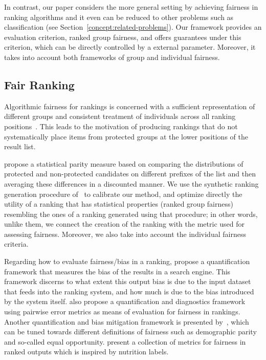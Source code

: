 In contrast, our paper considers the more general setting by achieving fairness in ranking algorithms and it even can be reduced to other problems such as classification (see Section~\ref{concept:related-problems}). Our framework provides an evaluation criterion, ranked group fairness, and offers guarantees under this criterion, which can be directly controlled by a external parameter. Moreover, it takes into account both frameworks of group and individual fairness.

\subsection{Fair Ranking}
\label{subsec:fair-ranking}
%
Algorithmic fairness for rankings is concerned with a sufficient representation of different groups and consistent treatment of individuals across all ranking positions~\cite{castillo2018fairness}.
%
This leads to the motivation of producing rankings that do not systematically place items from protected groups at the lower positions of the result list.

\citet{yang2016measuring} propose a statistical parity measure based on comparing the distributions of protected and non-protected candidates on different prefixes of the list and then averaging these differences in a discounted manner.
%
%
%
We use the synthetic ranking generation procedure of~\citet{yang2016measuring} to calibrate our method, and optimize directly the utility of a ranking that has statistical properties (ranked group fairness) resembling the ones of a ranking generated using that procedure; in other words, unlike them, we connect the creation of the ranking with the metric used for assessing fairness.
Moreover, we also take into account the individual fairness criteria.

Regarding how to evaluate fairness/bias in a ranking,
\citet{kulshrestha_2017_quantifying} propose a quantification framework that measures the bias of the results in a search engine.
This framework discerns to what extent this output bias is due to the input dataset that feeds into the ranking system, and how much is due to the bias introduced by the system itself.
%
\citet{kuhlman2019fare} also propose a quantification and diagnostics framework using pairwise error metrics as means of evaluation for fairness in rankings.
%
Another quantification and bias mitigation framework is presented by~\citet{geyik2019fairness}, which can be tuned towards different definitions of fairness such as demographic parity and so-called equal opportunity.
%
\citet{yang2018nutritional} present a collection of metrics for fairness in ranked outputs which is inspired by nutrition labels.
%


